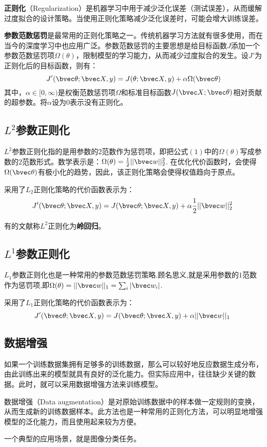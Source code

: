 
\textbf{正则化}（Regularization）是机器学习中用于减少泛化误差（测试误差），从而缓解过度拟合的设计策略。当使用正则化策略减少泛化误差时，可能会增大训练误差。

\textbf{参数范数惩罚}是最常用的正则化策略之一。传统机器学习方法就有很多使用，而在当今的深度学习中也应用广泛。参数范数惩罚的主要思想是给目标函数$J$添加一个参数范数惩罚项$\Omega(\theta)$，限制模型的学习能力，从而减少过度拟合的发生。设$J'$为正则化后的目标函数，则有：
\begin{equation}
J'(\bvec \theta;\bvec X,y)=J(\theta;\bvec X,y)+\alpha\Omega(\bvec \theta)
\end{equation}
其中，$\alpha\in[0,\infty)$是权衡范数惩罚项$\Omega$和标准目标函数$J(\bvec X;\bvec \theta)$相对贡献的超参数。将$\alpha$设为$0$表示没有正则化。

\subsection{$L^2$参数正则化}

$L^2$参数正则化指的是用参数的$2$范数作为惩罚项，即把公式$(1)$中的$\Omega(\theta)$写成参数的$2$范数形式。数学表示是：$\Omega(\theta)=\frac{1}{2}||\bvec w||_2^2$.
在优化代价函数时，会使得$\Omega(\bvec \theta)$有极小化的趋势，因此，该正则化策略会使得权值趋向于原点。

采用了$L_2$正则化策略的代价函数表示为：
\begin{equation}
J'(\bvec \theta;\bvec X,y)=J(\bvec \theta;\bvec X,y)+\alpha\frac{1}{2}||\bvec w||_2^2~
\end{equation}

有的文献称$L^2$正则化为\textbf{岭回归}。


\subsection{$L^1$参数正则化}

$L_1$参数正则化也是一种常用的参数范数惩罚策略.顾名思义,就是采用参数的$1$范数作为惩罚项,即$\Omega(\theta)=||\bvec w||_1=\sum_i|\bvec w_i|$.

采用了$L_1$正则化策略的代价函数表示为：
\begin{equation}
J'(\bvec \theta;\bvec X,y)=J(\bvec \theta;\bvec X,y)+\alpha||\bvec w||_1~
\end{equation}


\subsection{数据增强}

如果一个训练数据集拥有足够多的训练数据，那么可以较好地反应数据生成分布，由此训练出来的模型就具有良好的泛化能力。但实际应用中，往往缺少关键的数据。此时，就可以采用数据增强方法来训练模型。

数据增强（Data augmentation）是对原始训练数据中的样本做一定规则的变换，从而生成新的训练数据样本。此方法也是一种常用的正则化方法，可以明显地增强模型的泛化能力，而且使用起来较为方便。

一个典型的应用场景，就是图像分类任务。